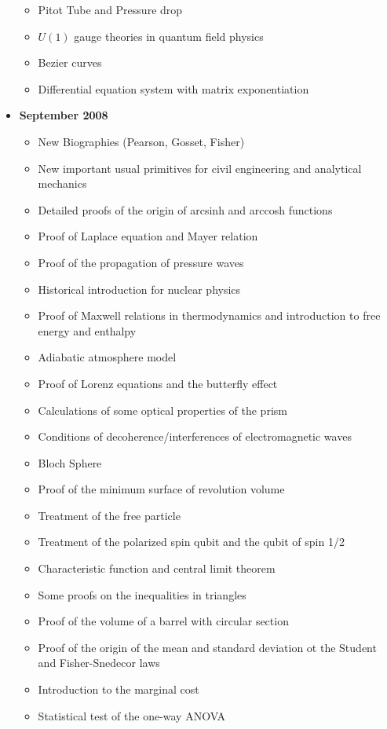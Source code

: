 \documentclass[12pt,a4paper,twoside,openright]{report}
\theoremstyle{definition}
\theoremstyle{itexmp}
\numberwithin{equation}{section}
\begin{document}
\begin{itemize}
\begin{itemize}[noitemsep]
				\item Pitot Tube and Pressure drop
				\item $U(1)$ gauge theories in quantum field physics
				\item Bezier curves
				\item Differential equation system with matrix exponentiation
			\end{itemize}
		\item \textbf{September 2008}
			\begin{itemize}[noitemsep]
				\item New Biographies (Pearson, Gosset, Fisher)
				\item New important usual primitives for civil engineering and analytical mechanics
				\item Detailed proofs of the origin of arcsinh and arccosh functions
				\item Proof of Laplace equation and Mayer relation
				\item Proof of the propagation of pressure waves
				\item Historical introduction for nuclear physics
				\item Proof of Maxwell relations in thermodynamics and introduction to free energy and enthalpy
				\item Adiabatic atmosphere model
				\item Proof of Lorenz equations and the butterfly effect
				\item Calculations of some optical properties of the prism
				\item Conditions of decoherence/interferences of electromagnetic waves
				\item Bloch Sphere
				\item Proof of the minimum surface of revolution volume
				\item Treatment of the free particle
				\item Treatment of the polarized spin qubit and the qubit of spin 1/2
				\item Characteristic function and central limit theorem
				\item Some proofs on the inequalities in triangles
				\item Proof of the volume of a barrel with circular section 
				\item Proof of the origin of the mean and standard deviation ot the Student and Fisher-Snedecor laws
				\item Introduction to the marginal cost
				\item Statistical test of the one-way ANOVA

\end{itemize}
\end{itemize}
\end{document}
